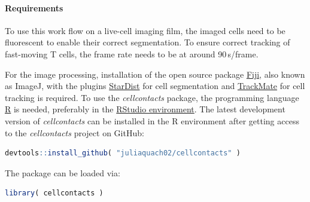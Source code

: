 \documentclass{report}
\begin{document}
\begin{figure}
\end{figure}



\paragraph{Requirements}
To use this work flow on a live-cell imaging film, the imaged cells need to be fluorescent to enable their correct segmentation. To ensure correct tracking of fast-moving T cells, the frame rate needs to be at around 90\,s/frame.

For the image processing, installation of the open source package \href{https://imagej.net/software/fiji/}{Fiji}, also known as ImageJ, with the plugins \href{https://imagej.net/plugins/stardist}{StarDist} for cell segmentation and \href{https://imagej.net/plugins/trackmate/}{TrackMate} for cell tracking is required.
To use the \textit{cellcontacts} package, the programming language \href{https://cran.r-project.org/bin/windows/base/}{R} is needed, preferably in the \href{https://posit.co/download/rstudio-desktop/}{RStudio environment}.
The latest development version of \textit{cellcontacts} can be installed in the R environment after getting access to the \textit{cellcontacts} project on GitHub:
\begin{lstlisting}[language=R]
	devtools::install_github( "juliaquach02/cellcontacts" ) 
\end{lstlisting}
The package can be loaded via:
\begin{lstlisting}[language=R]
	library( cellcontacts )
\end{lstlisting}
\end{document}
